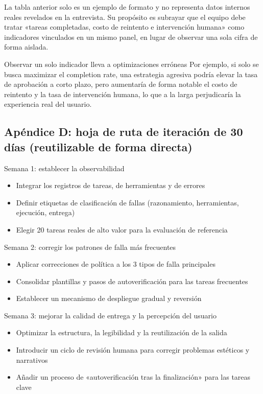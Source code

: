 La tabla anterior solo es un ejemplo de formato y no representa datos internos reales revelados en la entrevista. Su propósito es subrayar que el equipo debe tratar «tareas completadas, costo de reintento e intervención humana» como indicadores vinculados en un mismo panel, en lugar de observar una sola cifra de forma aislada.

\begin{warningbox}{Observar un solo indicador lleva a optimizaciones erróneas}
Por ejemplo, si solo se busca maximizar el completion rate, una estrategia agresiva podría elevar la tasa de aprobación a corto plazo, pero aumentaría de forma notable el costo de reintento y la tasa de intervención humana, lo que a la larga perjudicaría la experiencia real del usuario.
\end{warningbox}

\subsection{Apéndice D: hoja de ruta de iteración de 30 días (reutilizable de forma directa)}

\begin{knowledgebox}{Semana 1: establecer la observabilidad}
\begin{itemize}
    \item Integrar los registros de tareas, de herramientas y de errores
    \item Definir etiquetas de clasificación de fallas (razonamiento, herramientas, ejecución, entrega)
    \item Elegir 20 tareas reales de alto valor para la evaluación de referencia
\end{itemize}
\end{knowledgebox}

\begin{knowledgebox}{Semana 2: corregir los patrones de falla más frecuentes}
\begin{itemize}
    \item Aplicar correcciones de política a los 3 tipos de falla principales
    \item Consolidar plantillas y pasos de autoverificación para las tareas frecuentes
    \item Establecer un mecanismo de despliegue gradual y reversión
\end{itemize}
\end{knowledgebox}

\begin{knowledgebox}{Semana 3: mejorar la calidad de entrega y la percepción del usuario}
\begin{itemize}
    \item Optimizar la estructura, la legibilidad y la reutilización de la salida
    \item Introducir un ciclo de revisión humana para corregir problemas estéticos y narrativos
    \item Añadir un proceso de «autoverificación tras la finalización» para las tareas clave
\end{itemize}
\end{knowledgebox}

